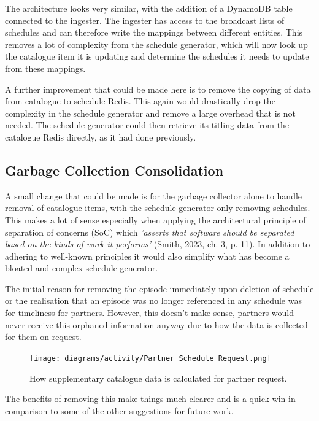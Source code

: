   The architecture looks very similar, with the addition of a DynamoDB table connected to the ingester. The ingester has access to the broadcast lists 
  of schedules and can therefore write the mappings between different entities. This removes a lot of complexity from the schedule generator, which will 
  now look up the catalogue item it is updating and determine the schedules it needs to update from these mappings. 

  A further improvement that could be made here is to remove the copying of data from catalogue to schedule Redis. This again would drastically drop the 
  complexity in the schedule generator and remove a large overhead that is not needed. The schedule generator could then retrieve its titling data from 
  the catalogue Redis directly, as it had done previously.

  \newpage
  \subsection{Garbage Collection Consolidation}
  \label{sec:garbageCollectorConsolidation}

  A small change that could be made is for the garbage collector alone to handle removal of catalogue items, with the schedule generator only 
  removing schedules. This makes a lot of sense especially when applying the architectural principle of separation of concerns (SoC) which 
  \textit{'asserts that software should be separated based on the kinds of work it performs'} (Smith, 2023, ch. 3, p. 11). In addition to adhering 
  to well-known principles it would also simplify what has become a bloated and complex schedule generator.

  The initial reason for removing the episode immediately upon deletion of schedule or the realisation that an episode was no longer referenced in 
  any schedule was for timeliness for partners. However, this doesn't make sense, partners would never receive this orphaned information anyway due to 
  how the data is collected for them on request.

  \begin{figure}[H]
    \centering
    \texttt{[image: diagrams/activity/Partner Schedule Request.png]}
    \caption{How supplementary catalogue data is calculated for partner request.}
    \label{fig:partnerRequest}
  \end{figure}  

  The benefits of removing this make things much clearer and is a quick win in comparison to some of the other suggestions for future work.
  
\newpage
